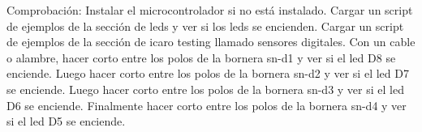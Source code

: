 \newpage

Comprobación:
Instalar el microcontrolador si no está instalado.
Cargar un script de ejemplos de la sección de leds y ver si los leds se encienden.
Cargar un script de ejemplos de la sección de icaro testing llamado sensores digitales. Con un cable o alambre, hacer corto entre los polos de la bornera sn-d1 y ver si el led D8 se enciende. Luego hacer corto entre los polos de la bornera sn-d2 y ver si el led D7 se enciende. Luego hacer corto entre los polos de la bornera sn-d3 y ver si el led D6 se enciende. Finalmente hacer corto entre los polos de la bornera sn-d4 y ver si el led D5 se enciende. 

